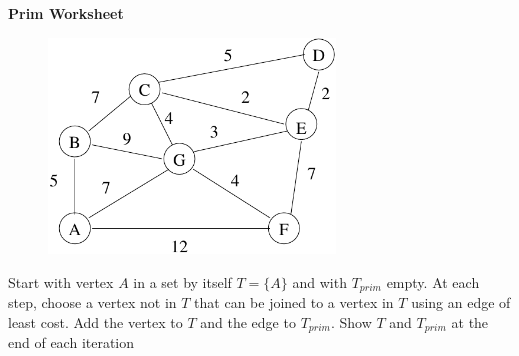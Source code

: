 \documentclass[12pt]{article}
\begin{document}
\newcommand{\I}{\mbox{{\em Int}}}
\newcommand{\lt}{\mbox{{\em left}}}
\newcommand{\rt}{\mbox{{\em right}}}
\newcommand{\ld}{\Delta^l}
\newcommand{\rd}{\Delta^r}
\newcommand{\lsp}[1]{\large\renewcommand{\baselinestretch}{#1}\normalsize}
\newcommand{\hsp}{\hspace{.2in}}

\def\Endwhile{\mbox{\bf endwhile\ }}
\def\Or{\mbox{\bf or\ }}
\def\Do{\mbox{\bf do\ }}
\def\Downto{\mbox{\bf downto\ }}
\def\Int{\mbox{\bf int\ }}
\def\To{\mbox{\bf to\ }}
\def\Repeat{\mbox{\bf repeat\ }}
\def\Until{\mbox{\bf until\ }}
\def\Return{\mbox{\bf return\ }}
\def\Not{\mbox{\bf not\ }}
\def\And{\mbox{\bf and\ }}
\def\For{\mbox{\bf for\ }}
\def\Foreach{\mbox{\bf foreach\ }}
\def\Else{\mbox{\bf else\ }}
\def\Elseif{\mbox{\bf elseif\ }}
\def\End{\mbox{\bf end\ }}
\def\If{\mbox{\bf if\ }}
\def\Mod{\mbox{\bf \ mod\ }}
\def\Then{\mbox{\bf then\ }}
\def\While{\mbox{\bf while\ }}
\def\Output{\mbox{\bf output\ }}


\lsp{1}
\pagestyle{plain}
\begin{center}
{\bf
Prim Worksheet
}
\end{center}

\begin{figure}[h]
\center
\includegraphics[width = 3in]{spanning.pdf}
\end{figure}

Start with vertex $A$ in a set by itself $T = \{A\}$ and with $T_{prim}$ 
empty. At each step, choose a vertex not in $T$ that can be joined to a 
vertex in $T$ using an edge of least cost. Add the vertex to $T$ and the
edge to $T_{prim}$. Show $T$ and $T_{prim}$ at the end of each iteration 
\end{document}
